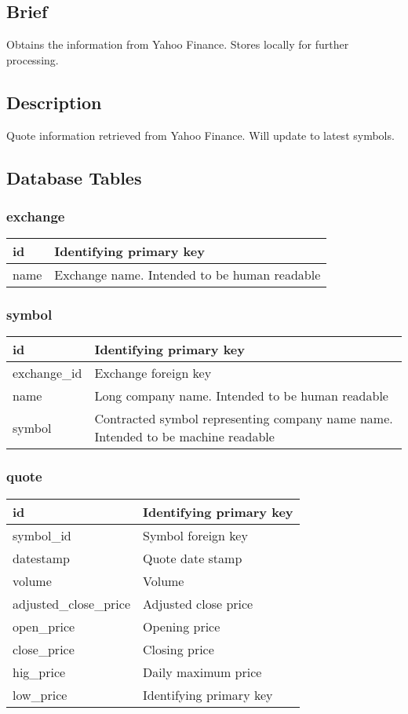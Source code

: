 \subsection{Brief}
Obtains the information from Yahoo Finance. Stores locally for further processing.
\subsection{Description}
Quote information retrieved from Yahoo Finance. Will update to latest symbols.
\subsection{Database Tables}
\subsubsection{exchange}
\begin{tabular}{|l||l|}
	\hline
	id 			& Identifying primary key \\ \hline
	name 		& Exchange name. \newline Intended to be human readable \\ \hline
\end{tabular}
\subsubsection{symbol}
\begin{tabular}{|l||l|}
	\hline
	id 				& Identifying primary key \\ \hline
	exchange\_id 	& Exchange foreign key \\ \hline
	name 			& Long company name. Intended to be human readable \\ \hline
	symbol 			& Contracted symbol representing company name name. Intended to be machine readable \\ \hline

\end{tabular}
\subsubsection{quote}
\begin{tabular}{|l||l|}
	\hline
	id 						& Identifying primary key \\ \hline
	symbol\_id				& Symbol foreign key \\ \hline
	datestamp				& Quote date stamp \\ \hline
	volume					& Volume \\ \hline
	adjusted\_close\_price	& Adjusted close price \\ \hline
	open\_price				& Opening price \\ \hline
	close\_price				& Closing price \\ \hline
	hig\_price				& Daily maximum price \\ \hline
	low\_price				& Identifying primary key \\ \hline
\end{tabular}
